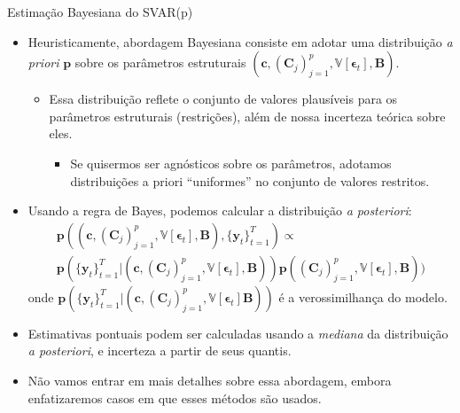 \documentclass[11pt]{beamer}
\begin{document}
\begin{frame}{Estimação Bayesiana do SVAR(p)}
	\begin{itemize}
	 	\item Heuristicamente, abordagem Bayesiana consiste em adotar uma distribuição \textit{a priori} $\boldsymbol{p}$ sobre os parâmetros estruturais $(\boldsymbol{c}, (\boldsymbol{C}_j)_{j=1}^p,\mathbb{V}[\boldsymbol{\epsilon}_t], \boldsymbol{B})$.
		\begin{itemize}
			\item Essa distribuição reflete o conjunto de valores plausíveis para os parâmetros estruturais (restrições), além de nossa incerteza teórica sobre eles.
			\begin{itemize}
				\item Se quisermos ser agnósticos sobre os parâmetros, adotamos distribuições a priori ``uniformes'' no conjunto de valores restritos.
			\end{itemize}
		\end{itemize}
		\item Usando a regra de Bayes, podemos calcular {\color{blue}a distribuição \textit{a posteriori}}:
		\begin{equation*}
			\begin{aligned}
				\boldsymbol{p}((\boldsymbol{c}, (\boldsymbol{C}_j)_{j=1}^p, \mathbb{V}[\boldsymbol{\epsilon}_t], \boldsymbol{B}), \{\boldsymbol{y}_t\}_{t=1}^T) \propto \\ \boldsymbol{p}(\{\boldsymbol{y}_t\}_{t=1}^T|(\boldsymbol{c}, (\boldsymbol{C}_j)_{j=1}^p,\mathbb{V}[\boldsymbol{\epsilon}_t], \boldsymbol{B})) \boldsymbol{p}((\boldsymbol{C}_j)_{j=1}^p,\mathbb{V}[\boldsymbol{\epsilon}_t], \boldsymbol{B})) 
			\end{aligned}
		\end{equation*}
		onde $\boldsymbol{p}(\{\boldsymbol{y}_t\}_{t=1}^T|(\boldsymbol{c}, (\boldsymbol{C}_j)_{j=1}^p,\mathbb{V}[\boldsymbol{\epsilon}_t]\boldsymbol{B}))$ é a verossimilhança do modelo.
		\item Estimativas pontuais podem ser calculadas usando a \textit{mediana} da distribuição \textit{a posteriori}, e incerteza a partir de seus quantis.
		\item Não vamos entrar em mais detalhes sobre essa abordagem, embora enfatizaremos casos em que esses métodos são usados.
	\end{itemize}
\end{frame}
\end{document}
